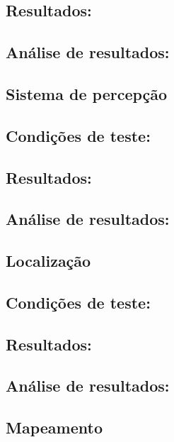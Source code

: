 \subsection*{\textbf{Resultados:}}  

\subsection*{\textbf{Análise de resultados:}}


\subsection{Sistema de percepção}

\subsection*{\textbf{Condições de teste:}}

\subsection*{\textbf{Resultados:}}  

\subsection*{\textbf{Análise de resultados:}}


\subsection{Localização}

\subsection*{\textbf{Condições de teste:}}

\subsection*{\textbf{Resultados:}}  

\subsection*{\textbf{Análise de resultados:}}


\subsection{Mapeamento}

